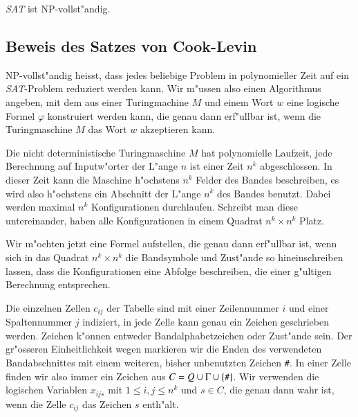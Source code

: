 \begin{satz}
\label{cooklevin}
\textsl{SAT} ist NP-vollst"andig.
\end{satz}



\subsection{Beweis des Satzes von Cook-Levin}

NP-vollst"andig heisst, dass jedes beliebige Problem in polynomieller
Zeit auf ein \textsl{SAT}-Problem reduziert werden kann.
Wir m"ussen
also einen Algorithmus angeben, mit dem aus einer Turingmachine
$M$ und einem Wort $w$
eine logische Formel $\varphi$ konstruiert werden kann, die genau
dann erf"ullbar ist, wenn die Turingmaschine $M$ das Wort $w$
akzeptieren kann.

Die nicht deterministische Turingmaschine $M$ hat polynomielle Laufzeit,
jede Berechnung auf Inputw"orter der L"ange $n$ ist einer Zeit $n^k$
abgeschlossen. In dieser Zeit kann die Maschine h"ochstens $n^k$ Felder
des Bandes beschreiben, es wird also h"ochstens ein Abschnitt der
L"ange $n^k$ des Bandes benutzt. Dabei werden maximal $n^k$
Konfigurationen durchlaufen. Schreibt man diese untereinander,
haben alle Konfigurationen in einem Quadrat $n^k\times n^k$
Platz.

Wir m"ochten jetzt eine Formel aufstellen, die genau dann erf"ullbar
ist, wenn sich in das Quadrat $n^k\times n^k$ die Bandsymbole und
Zust"ande so hineinschreiben lassen, dass die Konfigurationen eine
Abfolge beschreiben, die einer g"ultigen Berechnung entsprechen.

Die einzelnen Zellen $c_{ij}$ der Tabelle sind mit einer Zeilennummer $i$
und einer Spaltennummer $j$ indiziert, in jede Zelle kann
genau ein Zeichen geschrieben werden.
Zeichen k"onnen entweder Bandalphabetzeichen oder Zust"ande sein.
Der gr"osseren Einheitlichkeit wegen markieren wir die Enden des verwendeten
Bandabschnittes mit einem weiteren, bisher unbenutzten Zeichen {\tt\#}.
In einer Zelle finden wir also immer ein Zeichen aus $C=Q\cup \Gamma\cup\{\text{\tt\#}\}$.
Wir verwenden die logischen
Variablen $x_{ijs}$ mit $1\le i,j\le n^k$ und $s\in C$, die
genau dann wahr ist, wenn die Zelle $c_{ij}$ das Zeichen $s$ enth"alt.

